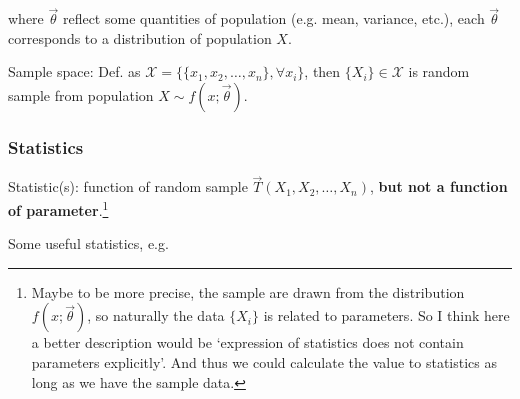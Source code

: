     where  $\vec{\theta}$ reflect some quantities of population (e.g. mean, variance, etc.), each $\vec{\theta}$ corresponds to a distribution of population $X$.
    
    Sample space: Def. as $\mathscr{X}=\{\{x_1,x_2,\ldots,x_n\},\forall x_i\}$, then $\{X_i\}\in\mathscr{X}$ is random sample from population $X\sim f(x;\vec{\theta})$.

    
\subsubsection{Statistics}\label{SubSectionStatistics}
    Statistic(s): function of random sample $\vec{T}(X_1,X_2,\ldots,X_n)$, \textbf{but not a function of parameter}.\footnote{Maybe to be more precise, the sample are drawn from the distribution $ f(x;\vec{\theta }) $, so naturally the data $ \{X_i\} $ is related to parameters. So I think here a better description would be `expression of statistics does not contain parameters explicitly'. And thus we could calculate the value to statistics as long as we have the sample data.}
    
\begin{point}
    Some useful statistics, e.g.
\end{point}
    
